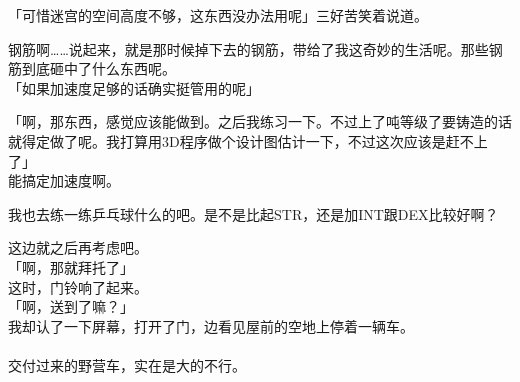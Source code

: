 「可惜迷宫的空间高度不够，这东西没办法用呢」三好苦笑着说道。

钢筋啊……说起来，就是那时候掉下去的钢筋，带给了我这奇妙的生活呢。那些钢筋到底砸中了什么东西呢。\\

「如果加速度足够的话确实挺管用的呢」

「啊，那东西，感觉应该能做到。之后我练习一下。不过上了吨等级了要铸造的话就得定做了呢。我打算用3D程序做个设计图估计一下，不过这次应该是赶不上了」\\

能搞定加速度啊。

我也去练一练乒乓球什么的吧。是不是比起STR，还是加INT跟DEX比较好啊？

这边就之后再考虑吧。\\

「啊，那就拜托了」\\

这时，门铃响了起来。\\

「啊，送到了嘛？」\\

我却认了一下屏幕，打开了门，边看见屋前的空地上停着一辆车。\\

\sqsplit\\

交付过来的野营车，实在是大的不行。\\

